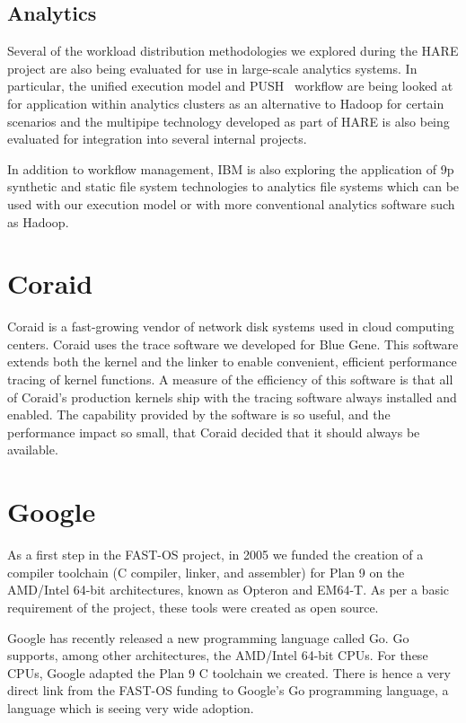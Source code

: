 \subsection{Analytics}

Several of the workload distribution methodologies we explored 
during the HARE project are also being evaluated for use in large-scale
analytics systems.  In particular, the unified execution model and PUSH~\cite{PUSH}
workflow are being looked at for application within analytics clusters as an alternative to
Hadoop for certain scenarios and the multipipe technology developed as part of HARE is
also being evaluated for integration into several internal projects.

In addition to workflow management, IBM is also exploring the application of
9p synthetic and static file system technologies to analytics file systems which
can be used with our execution model or with more conventional analytics software
such as Hadoop. 

\section{Coraid}
Coraid is a fast-growing vendor of network disk systems used in cloud computing centers. 
Coraid uses the trace software we developed\cite{plan9trace} for Blue Gene. 
This software extends both the kernel and the linker to enable convenient, efficient 
performance tracing of kernel functions. A measure of the efficiency of this software 
is that  all of Coraid's production
kernels ship with the tracing software always installed and enabled. 
The capability provided by the software is so useful, and the performance impact so small, 
that Coraid decided that it should always be available. 

\section{Google}
As a first step in the FAST-OS project, in 2005 we 
funded the creation of  a compiler toolchain (C compiler, linker, and assembler) for Plan 9 on the 
AMD/Intel 64-bit architectures, known as Opteron and EM64-T.
As per a basic requirement of the project, these
tools were created as open source. 

Google has recently released a new programming language called Go. Go supports, among other 
architectures, the AMD/Intel 64-bit CPUs. For these CPUs, Google adapted the  Plan 9 C toolchain
we created. There is hence a very direct link from the FAST-OS funding to Google's Go programming 
language, a language which is seeing very wide adoption. 
